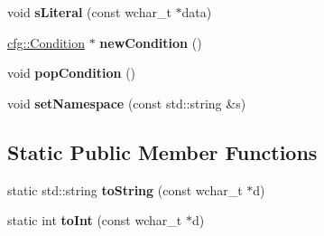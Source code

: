 \begin{DoxyCompactItemize}
\item 
\hypertarget{classCfgBuilder_ab213a7e0ed2e294ced2f08e1f79b5d37}{void {\bfseries s\-Literal} (const wchar\-\_\-t $\ast$data)}\label{classCfgBuilder_ab213a7e0ed2e294ced2f08e1f79b5d37}

\item 
\hypertarget{classCfgBuilder_a6afd2f47b9a7e107e236e9015d9be3a7}{\hyperlink{classcfg_1_1Condition}{cfg\-::\-Condition} $\ast$ {\bfseries new\-Condition} ()}\label{classCfgBuilder_a6afd2f47b9a7e107e236e9015d9be3a7}

\item 
\hypertarget{classCfgBuilder_aa995c209a3708a6776de7b568d37fcbf}{void {\bfseries pop\-Condition} ()}\label{classCfgBuilder_aa995c209a3708a6776de7b568d37fcbf}

\item 
\hypertarget{classCfgBuilder_a50ddecd4930af4282b10f31d3e17578d}{void {\bfseries set\-Namespace} (const std\-::string \&s)}\label{classCfgBuilder_a50ddecd4930af4282b10f31d3e17578d}

\end{DoxyCompactItemize}
\subsection*{Static Public Member Functions}
\begin{DoxyCompactItemize}
\item 
\hypertarget{classCfgBuilder_a7bd5f3def6b00f071877b2b81bb4c25a}{static std\-::string {\bfseries to\-String} (const wchar\-\_\-t $\ast$d)}\label{classCfgBuilder_a7bd5f3def6b00f071877b2b81bb4c25a}

\item 
\hypertarget{classCfgBuilder_aa620acd787a50158dd4a7e879a7fa8e3}{static int {\bfseries to\-Int} (const wchar\-\_\-t $\ast$d)}\label{classCfgBuilder_aa620acd787a50158dd4a7e879a7fa8e3}

\end{DoxyCompactItemize}
